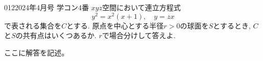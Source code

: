 \begin{prob}{012}{}{2024年4月号 学コン4番}
 $xyz$空間において連立方程式
 \[
 y^2 = x^2(x+1), \quad y=zx
 \]
 で表される集合を$C$とする. 原点を中心とする半径$r>0$の球面を$S$とするとき, $C$と$S$の共有点はいくつあるか. $r$で場合分けして答えよ.
\end{prob}

ここに解答を記述。
